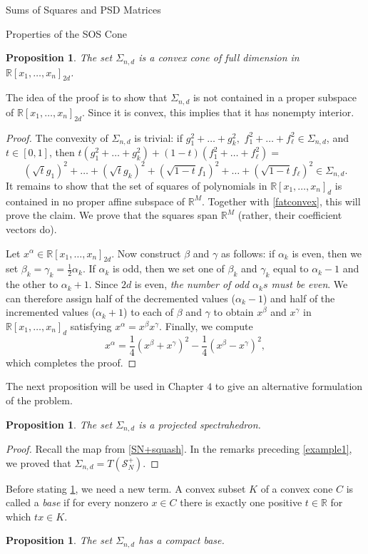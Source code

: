 \documentclass[12pt,oneside,final]{ucthesisucsbmath2010}
\newcommand{\R}{\mathbb{R}}
\newcommand{\s}{\mathcal{S}}
\newcommand{\snd}{\Sigma_{n,d}}
\newcommand{\pnd}{\R[x_1,\ldots,x_n]_{2d}}
\newcommand{\pn}{\R[x_1,\ldots,x_n]}
\newtheorem{prop}[thm]{Proposition}
\theoremstyle{definition}
\begin{document}
\begin{chapter}{Sums of Squares and PSD Matrices}
\begin{section}{Properties of the SOS Cone}
\begin{prop} The set $\snd$ is a convex cone of full dimension in $\pn_{2d}$.
\label{SOSfullD}
\end{prop}
The idea of the proof is to show that $\snd$ is not contained in a proper subspace of $\pnd$. Since it is convex, this implies that it has nonempty interior.
\begin{proof} The convexity of $\snd$ is trivial: if $g_1^2+\ldots+g_k^2,$ $f_1^2+\ldots+f_\ell^2 \in \snd$, and $t \in [0,1]$, then $t(g_1^2+\ldots+g_k^2)+(1-t)(f_1^2+\ldots+f_\ell^2)=$
\[(\sqrt{t}g_1)^2+\ldots+(\sqrt{t}g_k)^2+(\sqrt{1-t}f_1)^2+\ldots+(\sqrt{1-t}f_\ell)^2 \in \snd.\]
It remains to show that the set of squares of polynomials in $\pn_d$ is contained in no proper affine subspace of $\R^M$. Together with \ref{fatconvex}, this will prove the claim. We prove that the squares span $\R^M$ (rather, their coefficient vectors do).

Let $x^\alpha \in \pnd$. Now construct $\beta$ and $\gamma$ as follows: if $\alpha_k$ is even, then we set $\beta_k = \gamma_k = \frac{1}{2}\alpha_k$. If $\alpha_k$ is odd, then we set one of $\beta_k$ and $\gamma_k$ equal to $\alpha_k-1$ and the other to $\alpha_k+1$. Since $2d$ is even, \emph{the number of odd $\alpha_ks$ must be even}. We can therefore assign half of the decremented values ($\alpha_k-1$) and half of the incremented values ($\alpha_k+1$) to each of $\beta$ and $\gamma$ to obtain $x^\beta$ and $x^\gamma$ in $\pn_d$ satisfying $x^\alpha = x^\beta x^\gamma$. Finally, we compute
\[x^\alpha = \frac{1}{4}(x^\beta +x^\gamma)^2 - \frac{1}{4}(x^\beta-x^\gamma)^2,\]
which completes the proof.
\end{proof}

The next proposition will be used in Chapter $4$ to give an alternative formulation of the problem.

\begin{prop} The set $\snd$ is a projected spectrahedron.
\label{SOSspect}
\end{prop}
\begin{proof} Recall the map from \ref{SN+squash}. In the remarks preceding \ref{example1}, we proved that $\snd = T(\s_N^+)$.
\end{proof}

Before stating \ref{SOScompact}, we need a new term. A convex subset $K$ of a  convex cone $C$ is called a \emph{base} if for every nonzero $x \in C$ there is exactly one positive $t \in \R$ for which $tx \in K$. 

\begin{prop}The set $\snd$ has a compact base.
\label{SOScompact}
\end{prop}


\end{section}
\end{chapter}
\end{document}
